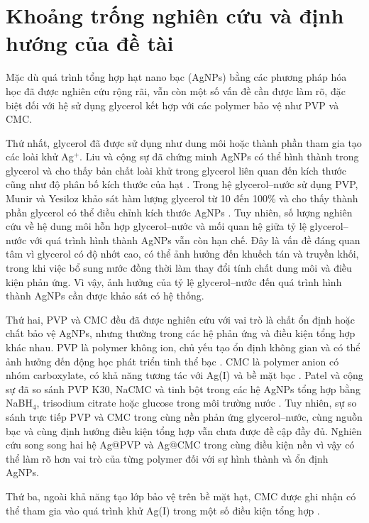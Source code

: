 \section{Khoảng trống nghiên cứu và định hướng của đề tài}
Mặc dù quá trình tổng hợp hạt nano bạc (AgNPs) bằng các phương pháp hóa học đã được nghiên cứu rộng rãi, vẫn còn một số vấn đề cần được làm rõ, đặc biệt đối với hệ sử dụng glycerol kết hợp với các polymer bảo vệ như PVP và CMC.
\par
Thứ nhất, glycerol đã được sử dụng như dung môi hoặc thành phần tham gia tạo các loài khử Ag$^+$.
Liu và cộng sự đã chứng minh AgNPs có thể hình thành trong glycerol và cho thấy bản chất loài khử trong glycerol liên quan đến kích thước cũng như độ phân bố kích thước của hạt \parencite{liu2020glycerol}.
Trong hệ glycerol--nước sử dụng PVP, Munir và Yesiloz khảo sát hàm lượng glycerol từ 10 đến 100\% và cho thấy thành phần glycerol có thể điều chỉnh kích thước AgNPs \parencite{munir2023}.
Tuy nhiên, số lượng nghiên cứu về hệ dung môi hỗn hợp glycerol--nước và mối quan hệ giữa tỷ lệ glycerol--nước với quá trình hình thành AgNPs vẫn còn hạn chế.
Đây là vấn đề đáng quan tâm vì glycerol có độ nhớt cao, có thể ảnh hưởng đến khuếch tán và truyền khối, trong khi việc bổ sung nước đồng thời làm thay đổi tính chất dung môi và điều kiện phản ứng.
Vì vậy, ảnh hưởng của tỷ lệ glycerol--nước đến quá trình hình thành AgNPs cần được khảo sát có hệ thống.
\par
Thứ hai, PVP và CMC đều đã được nghiên cứu với vai trò là chất ổn định hoặc chất bảo vệ AgNPs, nhưng thường trong các hệ phản ứng và điều kiện tổng hợp khác nhau.
PVP là polymer không ion, chủ yếu tạo ổn định không gian và có thể ảnh hưởng đến động học phát triển tinh thể bạc \parencite{ronavari2021,chen2019}.
CMC là polymer anion có nhóm carboxylate, có khả năng tương tác với Ag(I) và bề mặt bạc \parencite{hebeish2010,ly2024}.
Patel và cộng sự đã so sánh PVP K30, NaCMC và tinh bột trong các hệ AgNPs tổng hợp bằng NaBH$_4$, trisodium citrate hoặc glucose trong môi trường nước \parencite{patel2017}.
Tuy nhiên, sự so sánh trực tiếp PVP và CMC trong cùng nền phản ứng glycerol--nước, cùng nguồn bạc và cùng định hướng điều kiện tổng hợp vẫn chưa được đề cập đầy đủ.
Nghiên cứu song song hai hệ Ag@PVP và Ag@CMC trong cùng điều kiện nền vì vậy có thể làm rõ hơn vai trò của từng polymer đối với sự hình thành và ổn định AgNPs.
\par
Thứ ba, ngoài khả năng tạo lớp bảo vệ trên bề mặt hạt, CMC được ghi nhận có thể tham gia vào quá trình khử Ag(I) trong một số điều kiện tổng hợp \parencite{hebeish2010,ly2024}.
